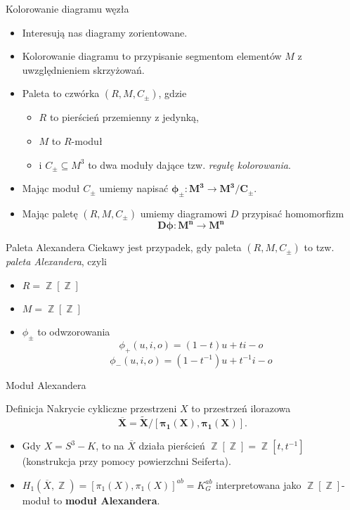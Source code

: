\documentclass{beamer}
\DeclareMathOperator{\Z}{\mathbb{Z}}
\newenvironment{deff}{\begin{block}{Definicja}}{\end{block}}
\begin{document}
  \begin{frame}{Kolorowanie diagramu węzła}
    \begin{itemize}
      \item Interesują nas diagramy zorientowane.
      \item Kolorowanie diagramu to przypisanie segmentom elementów $M$ z uwzględnieniem skrzyżowań.
      \item Paleta to czwórka $(R, M, C_\pm)$, gdzie 
        \begin{itemize}
          \item $R$ to pierścień przemienny z jedynką, 
          \item $M$ to $R$-moduł 
          \item i $C_\pm\subseteq M^3$ to dwa moduły dające tzw. \emph{regułę kolorowania}.
        \end{itemize}
      \item Mając moduł $C_\pm$ umiemy napisać $\boldsymbol{\phi_\pm: M^3\to M^3/C_\pm}$.
      \item Mając paletę $(R, M, C_\pm)$ umiemy diagramowi $D$ przypisać homomorfizm
        $$\boldsymbol{D\phi:M^n\to M^n}$$
    \end{itemize}
  \end{frame}

  \begin{frame}{Paleta Alexandera}
    Ciekawy jest przypadek, gdy paleta $(R, M, C_\pm)$ to tzw. \emph{paleta Alexandera}, czyli 
    \begin{itemize}
      \item $R=\Z[\Z]$
      \item $M=\Z[\Z]$
      \item $\phi_\pm$ to odwzorowania
      $$\phi_+(u,i,o)=(1-t)u+ti-o$$
      $$\phi_-(u,i,o)=(1-t^{-1})u+t^{-1}i-o$$
    \end{itemize}
  \end{frame}

  \begin{frame}{Moduł Alexandera}
    \begin{deff}
      Nakrycie cykliczne przestrzeni $X$ to przestrzeń ilorazowa 
      $$\boldsymbol{\overline{X}=\widetilde{X}/[\pi_1(X), \pi_1(X)]}.$$
    \end{deff}
    \begin{itemize}
      \item Gdy $X=S^3-K$, to na $\overline{X}$ działa pierścień $\Z[\Z]=\Z[t, t^{-1}]$ (konstrukcja przy pomocy powierzchni Seiferta).
      \item $H_1(\overline{X}, \Z)=[\pi_1(X), \pi_1(X)]^{ab}=K_G^{ab}$ interpretowana jako $\Z[\Z]$-moduł to \textbf{moduł Alexandera}.
    \end{itemize}
  \end{frame}
\end{document}
